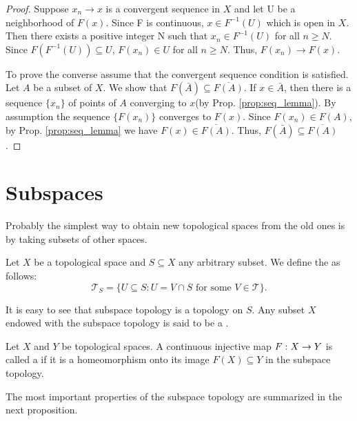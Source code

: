 \documentclass[11pt,a4paper]{article}
\begin{document}
\begin{proof}
    Suppose $x_n\rightarrow x$ is a convergent sequence in $X$ and let U be a neighborhood of $F(x)$. Since F is continuous, $x\in F^{-1}(U)$ which is open in $X$. Then there exists a positive integer N such that $x_n\in F^{-1}(U)$ for all $n\ge N$. Since $F(F^{-1}(U))\subseteq U$, $F(x_n)\in U$ for all $n\ge N$. Thus, $F(x_n)\rightarrow F(x)$.
    
    To prove the converse assume that the convergent sequence condition is satisfied. Let $A$ be a subset of $X$. We show that $F(\bar{A})\subseteq \overline{F(A)}$. If $x\in \bar{A}$, then there is a sequence $\{x_n\}$ of points of $A$ converging to $x$(by Prop. \ref{prop:seq_lemma}). By assumption the sequence $\{F(x_n)\}$ converges to $F(x)$. Since $F(x_n)\in F(A)$, by Prop. \ref{prop:seq_lemma} we have $F(x)\in \overline{F(A)}$. Thus, $F(\bar{A})\subseteq \overline{F(A)}$.
\end{proof}

\section{Subspaces}

Probably the simplest way to obtain new topological spaces from the old ones is by taking subsets of other spaces.

\begin{mydef}
    Let $X$ be a topological space and $S\subseteq X$ any arbitrary subset. We define the  as follows:
    $$
        \mathcal{T}_S = \{U\subseteq S: U = V\cap S \text{ for some } V\in \mathcal{T}\}.
    $$
\end{mydef}

It is easy to see that subspace topology is a topology on $S$. Any subset $X$ endowed with the subspace topology is said to be a .

\begin{mydef}
    Let $X$ and $Y$ be topological spaces. A continuous injective map $F:X\rightarrow Y$ is called a  if it is a homeomorphism onto its image $F(X)\subseteq Y$ in the subspace topology.
\end{mydef}

The most important properties of the subspace topology are summarized in the next proposition.
\end{document}
